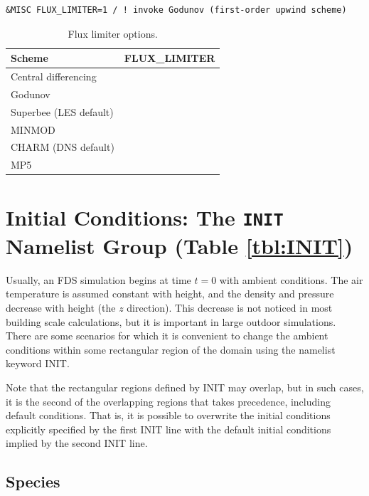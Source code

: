 \documentclass[11pt]{book}
\begin{document}
\begin{lstlisting}
&MISC FLUX_LIMITER=1 / ! invoke Godunov (first-order upwind scheme)
\end{lstlisting}

\begin{table}[ht]
\caption[Flux limiter options]{Flux limiter options.}
\label{tab:flux_limiters}
\centering
\begin{tabular}{|lc|}
\hline
Scheme                 & {\ct FLUX\_LIMITER} \\
\hline
Central differencing   & {\ct 0}  \\
Godunov                & {\ct 1}  \\
Superbee (LES default) & {\ct 2}  \\
MINMOD                 & {\ct 3}  \\
CHARM (DNS default)    & {\ct 4}  \\
MP5                    & {\ct 5}  \\ \hline
\end{tabular}
\end{table}



\section{Initial Conditions: The \texorpdfstring{{\tt INIT}}{INIT} Namelist Group (Table \ref{tbl:INIT})}
\label{info:INIT}

Usually, an FDS simulation begins at time $t=0$ with ambient conditions. The air temperature is assumed constant with height, and the density and pressure decrease with height (the $z$ direction). This decrease is not noticed in most building scale calculations, but it is important in large outdoor simulations. There are some scenarios for which it is convenient to change the ambient conditions within some rectangular region of the domain using the namelist keyword {\ct INIT}.

Note that the rectangular regions defined by {\ct INIT} may overlap, but in such cases, it is the second of the overlapping regions that takes precedence, including default conditions. That is, it is possible to overwrite the initial conditions explicitly specified by the first {\ct INIT} line with the default initial conditions implied by the second {\ct INIT} line.

\subsection*{Species}
\end{document}
